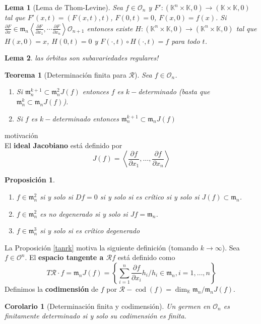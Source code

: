 \documentclass[12pt]{book}
\newtheorem{teo}{Teorema}
\newtheorem{lem}{Lema}
\newtheorem{pro}{Proposición}
\newtheorem{cor}{Corolario}
\newcommand{\rg}{\mathcal{R}}
\newcommand{\oo}{\mathcal{O}_n}
\newcommand{\mm}{\mathfrak{m}_n}
\begin{document}
\begin{lem}[Lema de Thom-Levine]
Sea $f\in \oo$ y $F':(\mathbb{K}^n \times \mathbb{K},0) \rightarrow (\mathbb{K}\times \mathbb{K}, 0) $ tal que $F'(x,t) = (F(x,t),t)$, $F(0,t)=0$, $F (x,0) = f(x)$. Si $\displaystyle\frac{\partial F}{\partial x}  \in  \mm \displaystyle\left\langle \frac{\partial F}{\partial x_1}, \cdots \frac{\partial F}{\partial x_n} \right\rangle \mathcal{O}_{n+1} $ entonces existe $H:(\mathbb{K}^n \times \mathbb{K},0) \rightarrow (\mathbb{K} ^n\times \mathbb{K}, 0)$ tal que $H(x,0) =x$, $H(0,t)=0$ y $F(\cdot, t) \circ H(\cdot, t) = f$ para todo $t$.
\end{lem}



\begin{lem}
las órbitas son subavariedades regulares!
\end{lem}

\begin{teo}[Determinación finita para $\rg$] Sea $f\in \oo$.
\begin{enumerate}
\item Si  $\mm ^{k+1} \subset \mm^2 J(f)$ entonces $f$ es $k-$determinado (basta que $\mm^k \subset \mm J(f)$).
\item Si $f$ es $k-$determinado entonces $\mm^{k+1}\subset \mm J(f)$
\end{enumerate}
\end{teo}

motivación\\

El \textbf{ideal Jacobiano} está definido por $$
J(f)=\left\langle\frac{\partial f}{\partial x_{1}}, \ldots, \frac{\partial f}{\partial x_{n}}\right\rangle
$$

\begin{pro}
\begin{enumerate}
\item  $f\in \mm^2$ si y solo si $Df=0$ si y solo si es crítico si y solo si $J(f) \subset \mm$.
\item $f\in \mm ^2$ es no degenerado si y solo si $Jf =\mm$.
\item $f\in \mm^3$ si y solo si es crítico degenerado
\end{enumerate}
\end{pro}


La Proposición \ref{tanrk} motiva la siguiente definición (tomando $k \rightarrow \infty$). Sea $f\in \mathcal{O}^n$. El \textbf{espacio tangente a $\mathcal{R}f$} está definido como $$
T \mathcal{R} \cdot f= \mathfrak{m}_n J(f)= \left\{\sum_{i=1}^{n} \frac{\partial f}{\partial x_{i}} h_{i} / h_{i} \in \mathfrak{m}_{n}, i=1, \ldots, n\right\}
$$
Definimos la \textbf{codimensión} de $f$ por $\rg-\operatorname{cod} (f) = \dim_\mathbb{K} \mm / \mm J(f)$.
\begin{cor}[Determinación finita y codimensión]
	Un germen en $\oo$ es finitamente determinado si y solo su codimensión es finita.
\end{cor}
\end{document}
